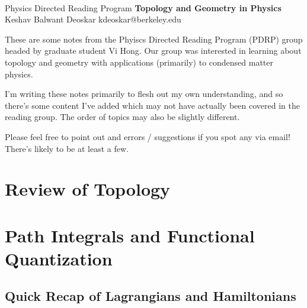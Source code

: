 \documentclass[11pt]{article}
\begin{document}
\thispagestyle{empty}
\bigskip \
\vspace{0.1cm}

\begin{center}
{\fontsize{22}{22} \selectfont Physics Directed Reading Program}
\vskip 16pt
{\fontsize{36}{36} \selectfont \bf \sffamily Topology and Geometry in Physics}
\vskip 24pt
{\fontsize{18}{18} \selectfont \rmfamily Keshav Balwant Deoskar} 
\vskip 6pt
{\fontsize{14}{14} \selectfont \ttfamily kdeoskar@berkeley.edu} 
\vskip 24pt
\end{center}



These are some notes from the Phyiscs Directed Reading Program (PDRP) group headed by graduate student Vi Hong. Our group was interested in learning about topology and geometry with applications (primarily) to condensed matter physics.   

\vskip 0.5cm
I'm writing these notes primarily to flesh out my own understanding, and so there's some content I've added which may not have actually been covered in the reading group. The order of topics may also be slightly different.

\vskip 0.5cm
\begin{redbox}
    Please feel free to point out and errors / suggestions if you spot any via email! There's likely to be at least a few. 
\end{redbox}

\tableofcontents 


\newpage
\section{Review of Topology}
\vskip 0.5cm


\newpage
\section{Path Integrals and Functional Quantization}

\vskip 0.5cm
\subsection{Quick Recap of Lagrangians and Hamiltonians}
\end{document}
